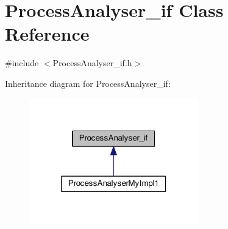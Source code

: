 \hypertarget{class_process_analyser__if}{\section{Process\-Analyser\-\_\-if Class Reference}
\label{class_process_analyser__if}
}


{\ttfamily \#include $<$Process\-Analyser\-\_\-if.\-h$>$}



Inheritance diagram for Process\-Analyser\-\_\-if\-:\nopagebreak
\begin{figure}[H]
\begin{center}
\leavevmode
\includegraphics[width=208pt]{class_process_analyser__if__inherit__graph}
\end{center}
\end{figure}
